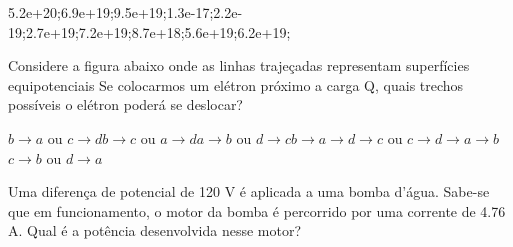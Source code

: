 \documentclass[12pt, addpoints]{exam}
\begin{document}
\begin{questions}
\begin{multicols*}{2}
\begin{oneparchoices}
\choice 5.2e+20;\choice 6.9e+19;\choice 9.5e+19;\choice 1.3e-17;\choice 2.2e-19;\choice 2.7e+19;\choice 7.2e+19;\choice 8.7e+18;\choice 5.6e+19;\choice 6.2e+19;\end{oneparchoices}
\question[20] Considere a figura abaixo onde as linhas trajeçadas representam superfícies equipotenciais Se colocarmos um elétron próximo a carga Q, quais trechos possíveis o elétron poderá se deslocar?
        
        \begin{center}
            \begin{minipage}[c]{0.5\linewidth}
            \end{minipage}
        \end{center}
        
        

\begin{choices}
\choice $b\rightarrow a$ ou $c\rightarrow d$\choice $b\rightarrow c$ ou $a\rightarrow d$\choice $a\rightarrow b$ ou $d\rightarrow c$\choice $b\rightarrow a\rightarrow d\rightarrow c$ ou $c\rightarrow d\rightarrow a\rightarrow b$\choice $c\rightarrow b$ ou $d\rightarrow a$\end{choices}
\question[20] Uma diferença de potencial de 120 V é aplicada a uma bomba d’água. Sabe-se que em funcionamento, o motor da bomba é percorrido por uma corrente de    4.76 A. Qual é a potência desenvolvida nesse motor?


\end{multicols*}
\end{questions}
\end{document}
